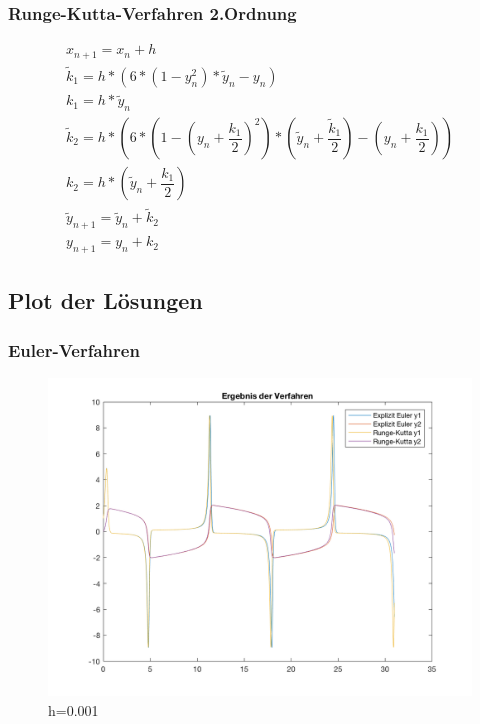 \documentclass[]{scrartcl}
\begin{document}
\subsubsection{Runge-Kutta-Verfahren 2.Ordnung}
\begin{align}
x_{n+1} = x_{n}+h \\
\tilde{k}_{1} = h * (6 * (1 - y_{n}^{2}) * \tilde{y}_{n} - y_{n}) \\
k_{1} = h * \tilde{y}_{n} \\
\tilde{k}_{2} = h * (6 * (1 - (y_{n} + \dfrac{k_{1}}{2})^{2}) * (\tilde{y}_{n} + \dfrac{\tilde{k}_{1}}{2}) - (y_{n} + \dfrac{k_{1}}{2})) \\
k_{2} = h * (\tilde{y}_{n} + \dfrac{k_{1}}{2}) \\
\tilde{y}_{n+1} = \tilde{y}_{n}+\tilde{k}_{2} \\
y_{n+1} = y_{n}+k_{2}
\end{align}

\subsection{Plot der Lösungen}
\subsubsection{Euler-Verfahren}
\begin{figure}[H]
\centering
\includegraphics[width=1\linewidth]{a1_2_1}
\caption{h=0.001}
\label{fig:a1_2_1}
\end{figure}
\end{document}
